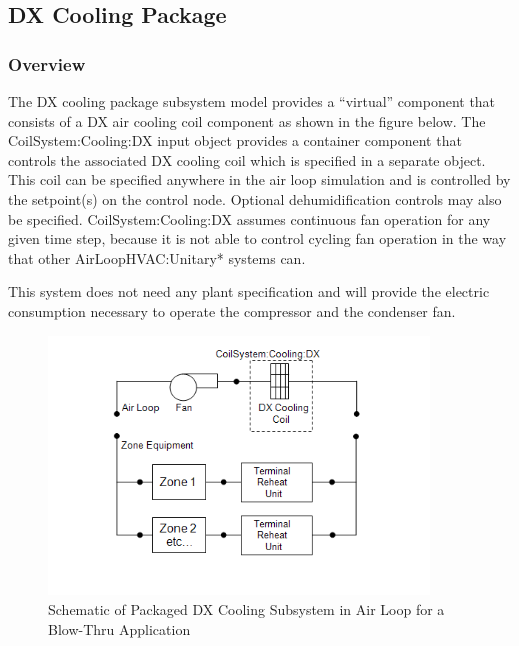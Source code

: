 \subsection{DX Cooling Package}\label{dx-cooling-package}

\subsubsection{Overview}\label{overview-5}

The DX cooling package subsystem model provides a ``virtual'' component that consists of a DX air cooling coil component as shown in the figure below. The CoilSystem:Cooling:DX input object provides a container component that controls the associated DX cooling coil which is specified in a separate object. This coil can be specified anywhere in the air loop simulation and is controlled by the setpoint(s) on the control node. Optional dehumidification controls may also be specified. CoilSystem:Cooling:DX assumes continuous fan operation for any given time step, because it is not able to control cycling fan operation in the way that other AirLoopHVAC:Unitary* systems can.

This system does not need any plant specification and will provide the electric consumption necessary to operate the compressor and the condenser fan.

\begin{figure}[hbtp] %
\centering
\includegraphics[width=0.9\textwidth, height=0.9\textheight, keepaspectratio=true]{media/image5198.png}
\caption{Schematic of Packaged DX Cooling Subsystem in Air Loop for a Blow-Thru Application \protect \label{fig:schematic-of-packaged-dx-cooling-subsystem-in}}
\end{figure}

